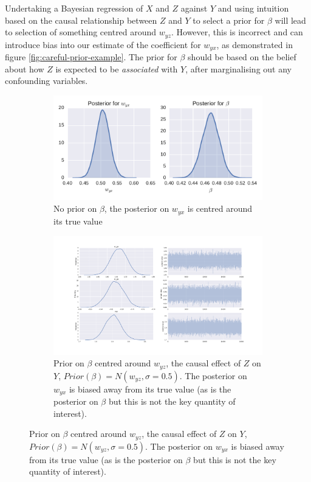 \documentclass[11pt,a4paper,twoside]{report}
\theoremstyle{plain}
\theoremstyle{definition}
\begin{document}
Undertaking a Bayesian regression of $X$ and $Z$ against $Y$ and using intuition based on the causal relationship between $Z$ and $Y$ to select a prior for $\beta$ will lead to selection of something centred around $w_{yz}$. However, this is incorrect and can introduce bias into our estimate of the coefficient for $w_{yx}$, as demonstrated in figure \ref{fig:careful-prior-example}. The prior for $\beta$ should be based on the belief about how $Z$ is expected to be \emph{associated} with $Y$, after marginalising out any confounding variables. 

\begin{figure}[ht]
\begin{subfigure}[t]{0.99\textwidth}
     \caption{No prior on $\beta$, the posterior on $w_{yx}$ is centred around its true value}
    \includegraphics[scale=1]{prior_no_prior}
\end{subfigure}
\begin{subfigure}[t]{0.99\textwidth}
     \caption{Prior on $\beta$ centred around $w_{yz}$, the causal effect of $Z$ on $Y$, $Prior(\beta)= N(w_{yz},\sigma = 0.5)$. The posterior on $w_{yx}$ is biased away from its true value (as is the posterior on $\beta$ but this is not the key quantity of interest).}
    \includegraphics[scale=1]{prior_bad_prior.pdf}

\end{subfigure}
\end{figure}
\end{document}

